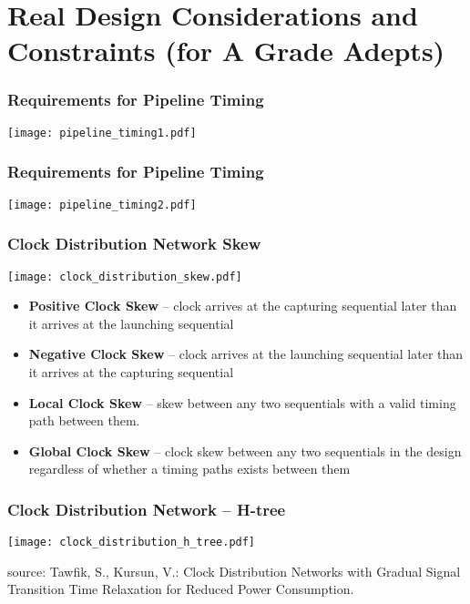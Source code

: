 \documentclass{beamer}
\begin{document}
\section{Real Design Considerations and Constraints (for A Grade Adepts)}

\begin{frame}
\frametitle{Requirements for Pipeline Timing}
\texttt{[image: pipeline\_timing1.pdf]}
\end{frame}

\begin{frame}
\frametitle{Requirements for Pipeline Timing}
\texttt{[image: pipeline\_timing2.pdf]}
\end{frame}

\begin{frame}
\frametitle{Clock Distribution Network Skew}
\texttt{[image: clock\_distribution\_skew.pdf]}

\begin{itemize}
 \item \textbf{Positive Clock Skew} -- clock arrives at the capturing sequential later than it arrives at the launching sequential
 \item \textbf{Negative Clock Skew} -- clock arrives at the launching sequential later than it arrives at the capturing sequential
 \item \textbf{Local Clock Skew} -- skew between any two sequentials with a valid timing path between them.
 \item \textbf{Global Clock Skew} -- clock skew between any two sequentials in the design regardless of whether a timing paths exists between them
\end{itemize}

\end{frame}

\begin{frame}
\frametitle{Clock Distribution Network -- H-tree}

{
\centering
\texttt{[image: clock\_distribution\_h\_tree.pdf]}
}

\vskip 2mm

source: Tawfik, S., Kursun, V.: Clock Distribution Networks with Gradual Signal Transition Time Relaxation for Reduced Power Consumption.

\end{frame}
\end{document}
